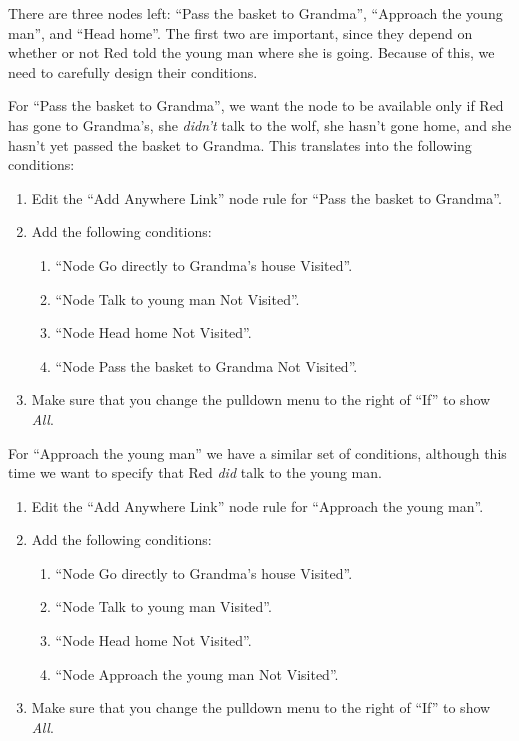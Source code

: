 \documentclass{article}
\begin{document}
There are three nodes left: ``Pass the basket to Grandma'', ``Approach the young man'', and ``Head home''. The first two are important, since they depend on whether or not Red told the young man where she is going. Because of this, we need to carefully design their conditions.

For ``Pass the basket to Grandma'', we want the node to be available only if Red has gone to Grandma's, she \textit{didn't} talk to the wolf, she hasn't gone home, and she hasn't yet passed the basket to Grandma. This translates into the following conditions:

\begin{enumerate}
  \item Edit the ``Add Anywhere Link'' node rule for ``Pass the basket to
  Grandma''.
  \item Add the following conditions:
  \begin{enumerate}
  \item ``Node Go directly to Grandma's house Visited''.
  \item ``Node Talk to young man Not Visited''.
  \item ``Node Head home Not Visited''.
  \item ``Node Pass the basket to Grandma Not Visited''.
\end{enumerate}
\item Make sure that you change the pulldown menu to the right of ``If'' to show \textit{All}.
\end{enumerate}

For ``Approach the young man'' we have a similar set of conditions, although this time we want to specify that Red \textit{did} talk to the young man.

\begin{enumerate}
  \item Edit the ``Add Anywhere Link'' node rule for ``Approach the young man''.
  \item Add the following conditions:
  \begin{enumerate}
  \item ``Node Go directly to Grandma's house Visited''.
  \item ``Node Talk to young man Visited''.
  \item ``Node Head home Not Visited''.
  \item ``Node Approach the young man Not Visited''.
\end{enumerate}
\item Make sure that you change the pulldown menu to the right of ``If'' to show \textit{All}.
\end{enumerate}
\end{document}
